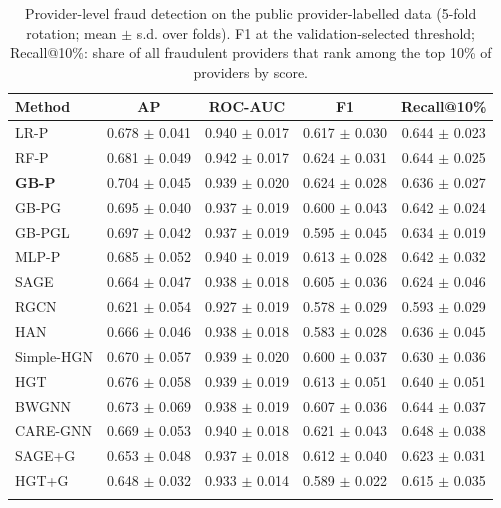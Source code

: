 \begin{table}[h]
\caption{Provider-level fraud detection on the public provider-labelled data (5-fold rotation; mean $\pm$ s.d. over folds). F1 at the validation-selected threshold; Recall@10\%: share of all fraudulent providers that rank among the top 10\% of providers by score.}\label{tab:kaggle}
\footnotesize
\begin{tabular}{@{}lcccc@{}}
\toprule
Method & AP & ROC-AUC & F1 & Recall@10\% \\
\midrule
LR-P & 0.678 $\pm$ 0.041 & 0.940 $\pm$ 0.017 & 0.617 $\pm$ 0.030 & 0.644 $\pm$ 0.023 \\
RF-P & 0.681 $\pm$ 0.049 & 0.942 $\pm$ 0.017 & 0.624 $\pm$ 0.031 & 0.644 $\pm$ 0.025 \\
\textbf{GB-P} & 0.704 $\pm$ 0.045 & 0.939 $\pm$ 0.020 & 0.624 $\pm$ 0.028 & 0.636 $\pm$ 0.027 \\
GB-PG & 0.695 $\pm$ 0.040 & 0.937 $\pm$ 0.019 & 0.600 $\pm$ 0.043 & 0.642 $\pm$ 0.024 \\
GB-PGL & 0.697 $\pm$ 0.042 & 0.937 $\pm$ 0.019 & 0.595 $\pm$ 0.045 & 0.634 $\pm$ 0.019 \\
MLP-P & 0.685 $\pm$ 0.052 & 0.940 $\pm$ 0.019 & 0.613 $\pm$ 0.028 & 0.642 $\pm$ 0.032 \\
SAGE & 0.664 $\pm$ 0.047 & 0.938 $\pm$ 0.018 & 0.605 $\pm$ 0.036 & 0.624 $\pm$ 0.046 \\
RGCN & 0.621 $\pm$ 0.054 & 0.927 $\pm$ 0.019 & 0.578 $\pm$ 0.029 & 0.593 $\pm$ 0.029 \\
HAN & 0.666 $\pm$ 0.046 & 0.938 $\pm$ 0.018 & 0.583 $\pm$ 0.028 & 0.636 $\pm$ 0.045 \\
Simple-HGN & 0.670 $\pm$ 0.057 & 0.939 $\pm$ 0.020 & 0.600 $\pm$ 0.037 & 0.630 $\pm$ 0.036 \\
HGT & 0.676 $\pm$ 0.058 & 0.939 $\pm$ 0.019 & 0.613 $\pm$ 0.051 & 0.640 $\pm$ 0.051 \\
BWGNN & 0.673 $\pm$ 0.069 & 0.938 $\pm$ 0.019 & 0.607 $\pm$ 0.036 & 0.644 $\pm$ 0.037 \\
CARE-GNN & 0.669 $\pm$ 0.053 & 0.940 $\pm$ 0.018 & 0.621 $\pm$ 0.043 & 0.648 $\pm$ 0.038 \\
SAGE+G & 0.653 $\pm$ 0.048 & 0.937 $\pm$ 0.018 & 0.612 $\pm$ 0.040 & 0.623 $\pm$ 0.031 \\
HGT+G & 0.648 $\pm$ 0.032 & 0.933 $\pm$ 0.014 & 0.589 $\pm$ 0.022 & 0.615 $\pm$ 0.035 \\
\botrule
\end{tabular}
\end{table}
